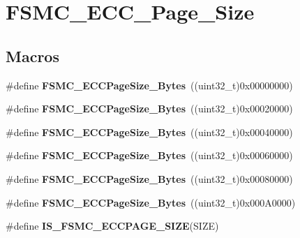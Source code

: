 \hypertarget{group___f_s_m_c___e_c_c___page___size}{}\section{F\+S\+M\+C\+\_\+\+E\+C\+C\+\_\+\+Page\+\_\+\+Size}
\label{group___f_s_m_c___e_c_c___page___size}
\subsection*{Macros}
\begin{DoxyCompactItemize}
\item 
\hypertarget{group___f_s_m_c___e_c_c___page___size_gaaa1661267b44e6728fa64aca79de54b3}{}\#define {\bfseries F\+S\+M\+C\+\_\+\+E\+C\+C\+Page\+Size\+\_\+Bytes}~((uint32\+\_\+t)0x00000000)\label{group___f_s_m_c___e_c_c___page___size_gaaa1661267b44e6728fa64aca79de54b3}

\item 
\hypertarget{group___f_s_m_c___e_c_c___page___size_gacb4da17c28dde89e38ff4ed40497f6b5}{}\#define {\bfseries F\+S\+M\+C\+\_\+\+E\+C\+C\+Page\+Size\+\_\+Bytes}~((uint32\+\_\+t)0x00020000)\label{group___f_s_m_c___e_c_c___page___size_gacb4da17c28dde89e38ff4ed40497f6b5}

\item 
\hypertarget{group___f_s_m_c___e_c_c___page___size_ga8137931c96b63ec7e6f80a8c7391433f}{}\#define {\bfseries F\+S\+M\+C\+\_\+\+E\+C\+C\+Page\+Size\+\_\+Bytes}~((uint32\+\_\+t)0x00040000)\label{group___f_s_m_c___e_c_c___page___size_ga8137931c96b63ec7e6f80a8c7391433f}

\item 
\hypertarget{group___f_s_m_c___e_c_c___page___size_gab8f3ae95becd59e71a976b97ded904b8}{}\#define {\bfseries F\+S\+M\+C\+\_\+\+E\+C\+C\+Page\+Size\+\_\+Bytes}~((uint32\+\_\+t)0x00060000)\label{group___f_s_m_c___e_c_c___page___size_gab8f3ae95becd59e71a976b97ded904b8}

\item 
\hypertarget{group___f_s_m_c___e_c_c___page___size_gaec2e9e434685a1756bd171699248f65a}{}\#define {\bfseries F\+S\+M\+C\+\_\+\+E\+C\+C\+Page\+Size\+\_\+Bytes}~((uint32\+\_\+t)0x00080000)\label{group___f_s_m_c___e_c_c___page___size_gaec2e9e434685a1756bd171699248f65a}

\item 
\hypertarget{group___f_s_m_c___e_c_c___page___size_gab6877a99ddf02e7aa95cf04896ce731d}{}\#define {\bfseries F\+S\+M\+C\+\_\+\+E\+C\+C\+Page\+Size\+\_\+Bytes}~((uint32\+\_\+t)0x000\+A0000)\label{group___f_s_m_c___e_c_c___page___size_gab6877a99ddf02e7aa95cf04896ce731d}

\item 
\#define {\bfseries I\+S\+\_\+\+F\+S\+M\+C\+\_\+\+E\+C\+C\+P\+A\+G\+E\+\_\+\+S\+I\+Z\+E}(S\+I\+Z\+E)
\end{DoxyCompactItemize}


